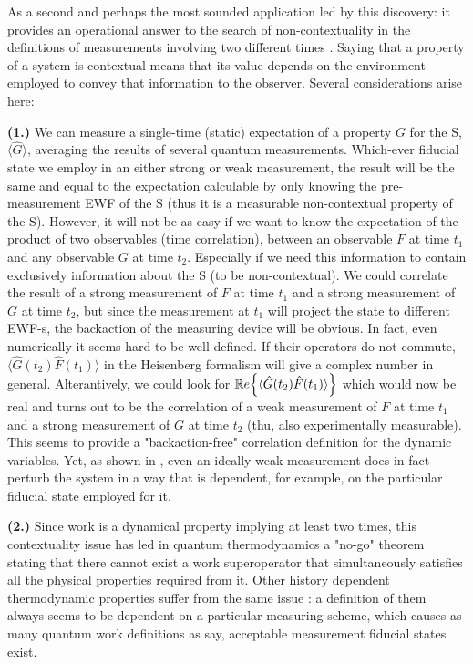 \documentclass[11pt, a4paper]{article} %
\begin{document}
As a second and perhaps the most sounded application led by this discovery: it provides an operational answer to the search of non-contextuality in the definitions of measurements involving two different times \cite{DevInPosition1}. Saying that a property of a system is contextual means that its value depends on the environment employed to convey that information to the observer. Several considerations arise here:

{\bf (1.)} We can measure a single-time (static) expectation of a property $G$ for the S, $\langle \hat{G}\rangle$, averaging the results of several quantum measurements. Which-ever fiducial state we employ in an either strong or weak measurement, the result will be the same and equal to the expectation calculable by only knowing the pre-measurement EWF of the S (thus it is a measurable non-contextual property of the S). However, it will not be as easy if we want to know the expectation of the product of two observables (time correlation), between an observable $F$ at time $t_1$ and any observable $G$ at time $t_2$. Especially if we need this information to contain exclusively information about the S (to be non-contextual). We could correlate the result of a strong measurement of $F$ at time $t_1$ and a strong measurement of $G$ at time $t_2$, but since the measurement at $t_1$ will project the state to different EWF-s, the backaction of the measuring device will be obvious. In fact, even numerically it seems hard to be well defined. If their operators do not commute, $\langle \hat{G}(t_2)\hat{F}(t_1)\rangle$ in the Heisenberg formalism will give a complex number in general. Alterantively, we could look for $\mathbb{R}e \qty{\langle \hat{G}(t_2)\hat{F}(t_1)\rangle}$ which would now be real and turns out to be the correlation of a weak measurement of $F$ at time $t_1$ and a strong measurement of $G$ at time $t_2$ (thu, also experimentally measurable). This seems to provide a "backaction-free" correlation definition for the dynamic variables. Yet, as shown in \cite{spin}, even an ideally weak measurement does in fact perturb the system in a way that is dependent, for example, on the particular fiducial state employed for it.

{\bf (2.)} Since work is a dynamical property implying at least two times, this contextuality issue has led in quantum thermodynamics a "no-go" theorem \cite{nogo} stating that there cannot exist a work superoperator that simultaneously satisfies all the physical properties required from it. Other history dependent thermodynamic properties suffer from the same issue \cite{workPb1, workPb2}: a definition of them always seems to be dependent on a particular measuring scheme, which causes as many quantum work definitions as say, acceptable measurement fiducial states exist.
\end{document}
